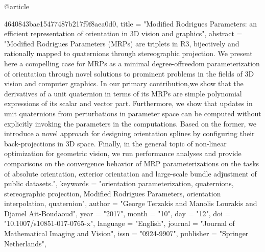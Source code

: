 @article{4640843bae15477487b217f9f8aea0d0,
title = "Modified Rodrigues Parameters: an efficient representation of orientation in 3D vision and graphics",
abstract = "Modified Rodrigues Parameters (MRPs) are triplets in R3, bijectively and rationally mapped to quaternions through stereographic projection. We present here a compelling case for MRPs as a minimal degree-offreedom parameterization of orientation through novel solutions to prominent problems in the fields of 3D vision and computer graphics. In our primary contribution,we show that the derivatives of a unit quaternion in terms of its MRPs are simple polynomial expressions of its scalar and vector part. Furthermore, we show that updates in unit quaternions from perturbations in parameter space can be computed without explicitly invoking the parameters in the computations. Based on the former, we introduce a novel approach for designing orientation splines by configuring their back-projections in 3D space. Finally, in the general topic of non-linear optimization for geometric vision, we run performance analyses and provide comparisons on the convergence behavior of MRP parameterizations on the tasks of absolute orientation, exterior orientation and large-scale bundle adjustment of public datasets.",
keywords = "orientation parameterization, quaternions, stereographic projection, Modified Rodrigues Parameters, orientation interpolation, quaternion",
author = "George Terzakis and Manolis Lourakis and Djamel Ait-Boudaoud",
year = "2017",
month = "10",
day = "12",
doi = "10.1007/s10851-017-0765-x",
language = "English",
journal = "Journal of Mathematical Imaging and Vision",
issn = "0924-9907",
publisher = "Springer Netherlands",

}